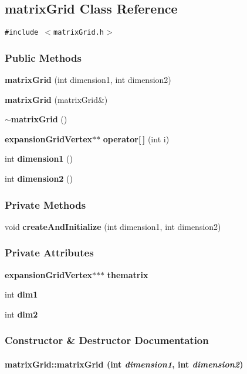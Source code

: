\subsection{matrix\-Grid  Class Reference}
\label{matrixGrid}
{\tt \#include $<$matrix\-Grid.h$>$}

\subsubsection*{Public Methods}
\begin{CompactItemize}
\item 
{\bf matrix\-Grid} (int dimension1, int dimension2)
\item 
{\bf matrix\-Grid} (matrix\-Grid\&)
\item 
{\bf $\sim$matrix\-Grid} ()
\item 
{\bf expansion\-Grid\-Vertex}$\ast$$\ast$ {\bf operator[$\,$]} (int i)
\item 
int {\bf dimension1} ()
\item 
int {\bf dimension2} ()
\end{CompactItemize}
\subsubsection*{Private Methods}
\begin{CompactItemize}
\item 
void {\bf create\-And\-Initialize} (int dimension1, int dimension2)
\end{CompactItemize}
\subsubsection*{Private Attributes}
\begin{CompactItemize}
\item 
{\bf expansion\-Grid\-Vertex}$\ast$$\ast$$\ast$ {\bf thematrix}
\item 
int {\bf dim1}
\item 
int {\bf dim2}
\end{CompactItemize}


\subsubsection{Constructor \& Destructor Documentation}
\label{matrixGrid_a0}
\paragraph{\setlength{\rightskip}{0pt plus 5cm}matrix\-Grid::matrix\-Grid (int {\em dimension1}, int {\em dimension2})}\hfill



